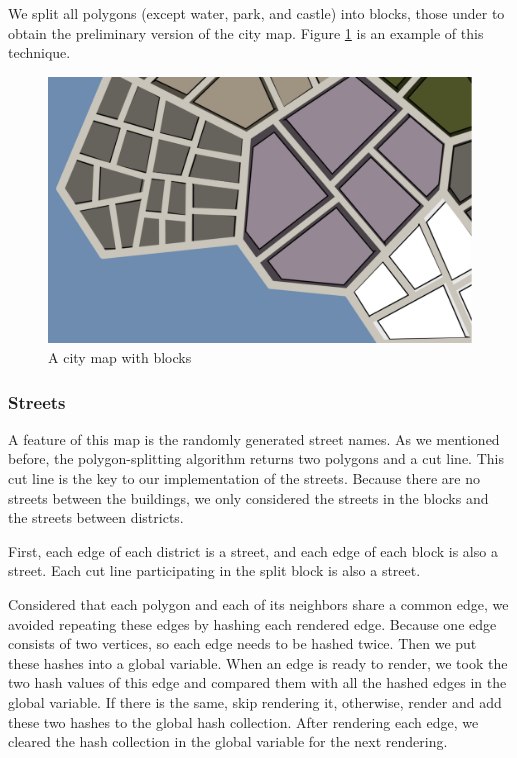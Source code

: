 We split all polygons (except water, park, and castle) into blocks, those under to obtain the preliminary version of the city map. Figure \ref{fig:blocks} is an example of this technique.

\begin{figure}[htbp]
  \includegraphics[width=\textwidth]{section04/assets/Map-blocks-no-buildings.png}
  \caption{A city map with blocks}
  \label{fig:blocks}
\end{figure}

\subsubsection{Streets}
A feature of this map is the randomly generated street names. As we mentioned before, the polygon-splitting algorithm returns two polygons and a cut line. This cut line is the key to our implementation of the streets. Because there are no streets between the buildings, we only considered the streets in the blocks and the streets between districts.

First, each edge of each district is a street, and each edge of each block is also a street. Each cut line participating in the split block is also a street.

Considered that each polygon and each of its neighbors share a common edge, we avoided repeating these edges by hashing each rendered edge. Because one edge consists of two vertices, so each edge needs to be hashed twice. Then we put these hashes into a global variable. When an edge is ready to render, we took the two hash values of this edge and compared them with all the hashed edges in the global variable. If there is the same, skip rendering it, otherwise, render and add these two hashes to the global hash collection. After rendering each edge, we cleared the hash collection in the global variable for the next rendering.

